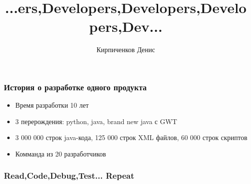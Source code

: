 \documentclass[10pt,pdf,hyperref={unicode}]{beamer}
\date{}
\title[]{...ers,Developers,Developers,Developers,Dev...}
\author[]{Кирпиченков Денис}
\institute[]{Naumen}
\begin{document}
\begin{frame}
\titlepage
\end{frame} 

\begin{frame}
\frametitle{История о разработке одного продукта} 

\begin{itemize}
\item Время разработки 10 лет
\item 3 перерождения: python, java, brand new java с GWT
\item 3 000 000 строк java-кода, 125 000 строк XML файлов,  60 000 строк скриптов
\item Комманда из 20 разработчиков
\end{itemize}

\end{frame}

\begin{frame}
\frametitle{Read,Code,Debug,Test... Repeat} 
\end{frame}
\end{document}
